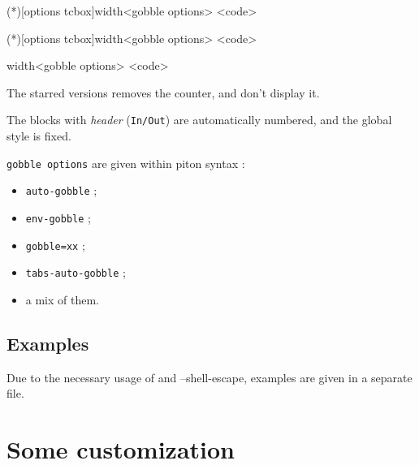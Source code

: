 \documentclass[english,11pt,a4paper]{article}
\begin{document}
\begin{codehigh}[language=latex/latex2,style/main=cyan!10,style/code=cyan!10]
\begin{NotebookPitonOut}(*)[options tcbox]{width}<gobble options>
<code>
\end{NotebookPitonOut}
\end{codehigh}

\begin{codehigh}[language=latex/latex2,style/main=cyan!10,style/code=cyan!10]
\begin{NotebookPitonInOut}(*)[options tcbox]{width}<gobble options>
<code>
\end{NotebookPitonInOut}
\end{codehigh}

\begin{codehigh}[language=latex/latex2,style/main=cyan!10,style/code=cyan!10]
\begin{NotebookPitonConsole}{width}<gobble options>
<code>
\end{NotebookPitonConsole}
\end{codehigh}

The starred versions removes the counter, and don't display it.

The blocks with \textit{header} (\texttt{In/Out}) are automatically numbered, and the global style is fixed.

\smallskip

\texttt{gobble options} are given within \textsf{piton} syntax :

\begin{itemize}
	\item \texttt{auto-gobble} ;
	\item \texttt{env-gobble} ;
	\item \texttt{gobble=xx} ;
	\item \texttt{tabs-auto-gobble} ;
	\item a mix of them.
\end{itemize}

\subsection{Examples}

Due to the necessary usage of  and \textsf{--shell-escape}, examples are given in a separate file.

\pagebreak

\section{Some customization}
\end{document}
